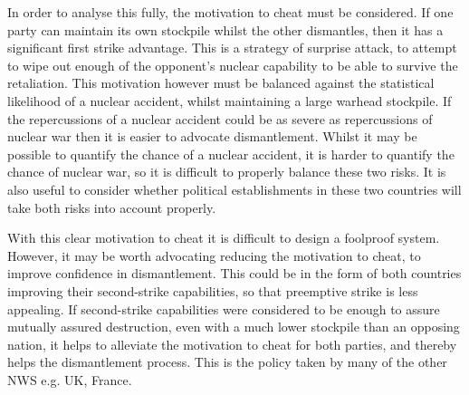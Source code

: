 \documentclass[twoside,titlepage,11pt,twocolumn,a4paper]{article}
\begin{document}
In order to analyse this fully, the motivation to cheat must be
considered.  If one party can maintain its own stockpile whilst the
other dismantles, then it has a significant first strike
advantage. This is a strategy of surprise attack, to attempt to wipe
out enough of the opponent's nuclear capability to be able to survive
the retaliation. This motivation however must be balanced against the
statistical likelihood of a nuclear accident, whilst maintaining a
large warhead stockpile. If the repercussions of a nuclear accident
could be as severe as repercussions of nuclear war then it is easier
to advocate dismantlement. Whilst it may be possible to quantify the
chance of a nuclear accident, it is harder to quantify the chance of
nuclear war, so it is difficult to properly balance these two
risks. It is also useful to consider whether political establishments
in these two countries will take both risks into account properly.

With this clear motivation to cheat it is difficult to design a
foolproof system. However, it may be worth advocating reducing the
motivation to cheat, to improve confidence in dismantlement. This
could be in the form of both countries improving their second-strike
capabilities, so that preemptive strike is less appealing. If
second-strike capabilities were considered to be enough to assure
mutually assured destruction, even with a much lower stockpile than an
opposing nation, it helps to alleviate the motivation to cheat for
both parties, and thereby helps the dismantlement process. This is the
policy taken by many of the other NWS e.g. UK, France.

\renewcommand{\refname}{\vspace*{-1.5em}\section{Bibliography}\vspace*{-1em}}


\end{document}
